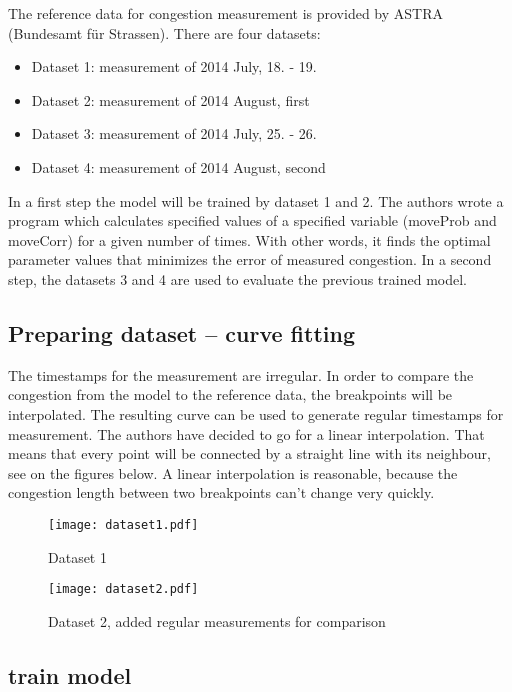 
The reference data for congestion measurement is provided by ASTRA (Bundesamt für Strassen). There are four datasets: 
\begin{itemize}
\item Dataset 1: measurement of 2014 July, 18. - 19.
\item Dataset 2: measurement of 2014 August, first
\item Dataset 3: measurement of 2014 July, 25. - 26.
\item Dataset 4: measurement of 2014 August, second
\end{itemize}

In a first step the model will be trained by dataset 1 and 2. The authors wrote a program which calculates specified values of a specified variable (moveProb and moveCorr) for a given number of times. With other words, it finds the optimal parameter values that minimizes the error of measured congestion. In a second step, the datasets 3 and 4 are used to evaluate the previous trained model.

\subsection{Preparing dataset -- curve fitting}
The timestamps for the measurement are irregular. In order to compare the congestion from the model to the reference data, the breakpoints will be interpolated. The resulting curve can be used to generate regular timestamps for measurement. The authors have decided to go for a linear interpolation. That means that every point will be connected by a straight line with its neighbour, see on the figures below. A linear interpolation is reasonable, because the congestion length between two breakpoints can't change very quickly.


\begin{figure}[h]\centering
\texttt{[image: dataset1.pdf]}
\caption{Dataset 1}
\end{figure}

\begin{figure}[h]\centering
\texttt{[image: dataset2.pdf]}
\caption{Dataset 2, added regular measurements for comparison}
\end{figure}

\subsection{train model}
\newpage